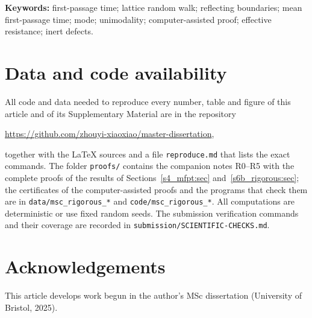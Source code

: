 \documentclass[11pt,a4paper]{article}
\begin{document}
\begin{abstract}
Several of these proofs are computer-assisted, with stated trusted bases and reproducible certificates. On the square lattice of side $35$, uniformly random
blocked sites up to a fraction $0.2$ multiply mean and mode by nearly the same factor, the homogenised dilation of
time $\Dzero/\Deff$, so that $\tmode/\MF$ changes by a few per cent at low density and by $4.7$--$8.9\%$ at the fraction
$0.2$, whereas the placement of the blocked sites, not their number, decides the direction in which $\tmode/\MF$
changes.
\end{abstract}

\noindent\textbf{Keywords:} first-passage time; lattice random walk; reflecting boundaries; mean first-passage
time; mode; unimodality; computer-assisted proof; effective resistance; inert defects.











\section*{Data and code availability}
All code and data needed to reproduce every number, table and figure of this article and of its Supplementary
Material are in the repository \citep{ZhouyiRepo}
\begin{center}\url{https://github.com/zhouyi-xiaoxiao/master-dissertation},\end{center}
together with the \LaTeX{} sources and a file \texttt{reproduce.md} that lists the exact commands. The folder
\texttt{proofs/} contains the companion notes R0--R5 \citep{NoteR0,NoteR1,NoteR2,NoteR3,NoteR4,NoteR5} with the
complete proofs of the results of Sections~\ref{s4_mfpt:sec} and~\ref{s6b_rigorous:sec}; the certificates of the computer-assisted proofs and the programs that check them are
in \texttt{data/msc\_rigorous\_*} and \texttt{code/msc\_rigorous\_*}. All computations are deterministic or use fixed
random seeds. The submission verification commands and their coverage are recorded in
\texttt{submission/SCIENTIFIC-CHECKS.md}.

\section*{Acknowledgements}
This article develops work begun in the author's MSc dissertation (University of Bristol, 2025).



\end{document}
